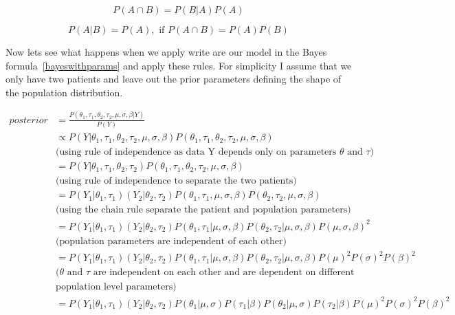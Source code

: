 \documentclass[12pt,a4paper,leqno]{report}
\theoremstyle{plain}
\theoremstyle{definition}
\theoremstyle{remark}
\begin{document}
\begin{def}\label{}
    \begin{equation}\label{chainrule}
        P(A \cap B) = P(B|A)P(A)
    \end{equation}
\end{def}

\begin{def}\label{}
    \begin{equation}\label{chainrule}
        P(A|B) = P(A), \text{ if } P(A \cap B) = P(A)P(B)
    \end{equation}
\end{def}

Now lets see what happens when we apply write are our model in the Bayes formula\
\ref{bayeswithparams} and apply these rules. For simplicity I assume that we only have
two patients and leave out the prior parameters defining the shape of the population distribution.


\begin{equation*}\label{}
    \begin{aligned}\label{conjugatebayesrule}
        posterior &= \frac{P(\theta_1,\tau_1,\theta_2,\tau_2,\mu,\sigma,\beta| Y)}{P(Y)} \\
        &\propto P(Y|\theta_1,\tau_1,\theta_2,\tau_2,\mu,\sigma,\beta)P(\theta_1,\tau_1,\theta_2,\tau_2,\mu,\sigma,\beta) \nonumber \\
        &\text{(using rule of independence as data Y depends only on parameters $\theta$ and $\tau$)} \nonumber \\
        &= P(Y|\theta_1,\tau_1, \theta_2, \tau_2)P(\theta_1,\tau_1,\theta_2,\tau_2,\mu,\sigma,\beta) \nonumber \\
        &\text{(using rule of independence to separate the two patients)} \nonumber \\
        &= P(Y_1|\theta_1,\tau_1)(Y_2|\theta_2, \tau_2)P(\theta_1,\tau_1, \mu,\sigma,\beta)P(\theta_2,\tau_2,\mu,\sigma,\beta) \nonumber \\
        &\text{(using the chain rule separate the patient and population parameters)} \nonumber \\
        &= P(Y_1|\theta_1,\tau_1)(Y_2|\theta_2, \tau_2)P(\theta_1,\tau_1|\mu,\sigma,\beta)P(\theta_2,\tau_2|\mu,\sigma,\beta)P(\mu,\sigma,\beta)^2 \nonumber \\
        &\text{(population parameters are independent of each other)} \nonumber \\
        &= P(Y_1|\theta_1,\tau_1)(Y_2|\theta_2, \tau_2)P(\theta_1,\tau_1|\mu,\sigma,\beta)P(\theta_2,\tau_2|\mu,\sigma,\beta)P(\mu)^2P(\sigma)^2P(\beta)^2 \nonumber \\
        &\text{($\theta$ and $\tau$ are independent on each other and are dependent on different} \nonumber \\
        & \text{population level parameters)} \nonumber \\
        &= P(Y_1|\theta_1,\tau_1)(Y_2|\theta_2, \tau_2)P(\theta_1|\mu,\sigma)P(\tau_1|\beta)P(\theta_2|\mu,\sigma)P(\tau_2|\beta)P(\mu)^2P(\sigma)^2P(\beta)^2 \nonumber
    \end{aligned}
\end{equation*}
\end{document}
